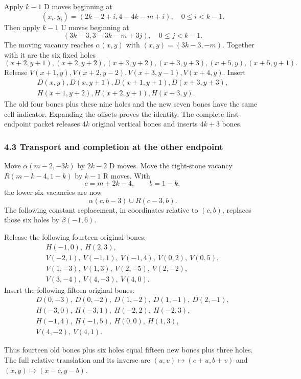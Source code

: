 Apply \(k-1\) D moves beginning at \[
(x_i,y_i)=(2k-2+i,4-4k-m+i),\quad 0\le i<k-1.
\] Then apply \(k-1\) U moves beginning at \[
(3k-3,3-3k-m+3j),\quad0\le j<k-1.
\] The moving vacancy reaches \(\alpha(x,y)\) with \((x,y)=(3k-3,-m)\).
Together with it are the six fixed holes \[
(x+2,y+1),(x+2,y+2),(x+3,y+2),(x+3,y+3),(x+5,y),(x+5,y+1).
\] Release \(V(x+1,y),V(x+2,y-2),V(x+3,y-1),V(x+4,y)\). Insert \[
\begin{gathered}
D(x,y),D(x,y+1),D(x+1,y+1),D(x+3,y+3),\\
H(x+1,y+2),H(x+2,y+1),H(x+3,y).
\end{gathered}
\] The old four bones plus these nine holes and the new seven bones have
the same cell indicator. Expanding the offsets proves the identity. The
complete first-endpoint packet releases \(4k\) original vertical bones
and inserts \(4k+3\) bones.

\subsubsection{4.3 Transport and completion at the other
endpoint}\label{transport-and-completion-at-the-other-endpoint}

Move \(\alpha(m-2,-3k)\) by \(2k-2\) D moves. Move the right-stone
vacancy \(R(m-k-4,1-k)\) by \(k-1\) R moves. With \[
c=m+2k-4,\qquad b=1-k,
\] the lower six vacancies are now \[
\alpha(c,b-3)\cup R(c-3,b).
\] The following constant replacement, in coordinates relative to
\((c,b)\), replaces those six holes by \(\beta(-1,6)\).

Release the following fourteen original bones: \[
\begin{gathered}
H(-1,0),\ H(2,3),\\
V(-2,1),\ V(-1,1),\ V(-1,4),\ V(0,2),\ V(0,5),\\
V(1,-3),\ V(1,3),\ V(2,-5),\ V(2,-2),\\
V(3,-4),\ V(4,-3),\ V(4,0).
\end{gathered}
\] Insert the following fifteen original bones: \[
\begin{gathered}
D(0,-3),\ D(0,-2),\ D(1,-2),\ D(1,-1),\ D(2,-1),\\
H(-3,0),\ H(-3,1),\ H(-2,2),\ H(-2,3),\\
H(-1,4),\ H(-1,5),\ H(0,0),\ H(1,3),\\
V(4,-2),\ V(4,1).
\end{gathered}
\]

Thus fourteen old bones plus six holes equal fifteen new bones plus
three holes. The full relative translation and its inverse are
\((u,v)\mapsto(c+u,b+v)\) and \((x,y)\mapsto(x-c,y-b)\).

